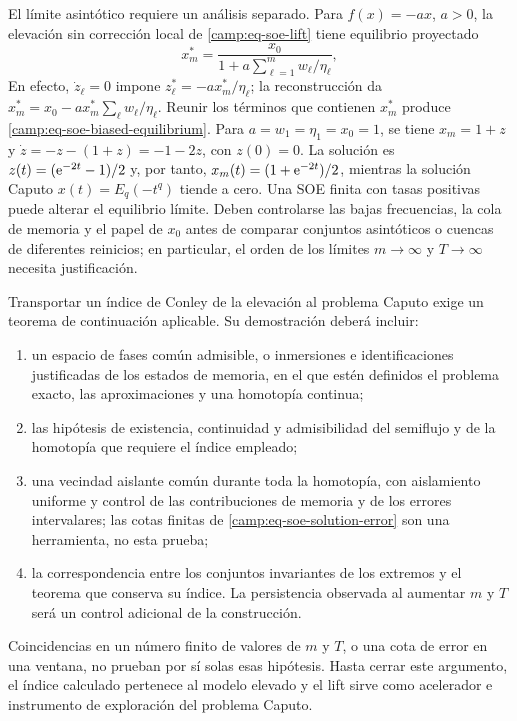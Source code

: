 El límite asintótico requiere un análisis separado. Para \(f(x)=-ax\),
\(a>0\), la elevación sin corrección local de \cref{camp:eq-soe-lift} tiene
equilibrio proyectado
\begin{equation}
 x_m^*=\frac{x_0}{1+a\sum_{\ell=1}^{m}w_\ell/\eta_\ell},
 \label{camp:eq-soe-biased-equilibrium}
\end{equation}
En efecto, \(\dot z_\ell=0\) impone
\(z_\ell^*=-ax_m^*/\eta_\ell\); la reconstrucción da
\(x_m^*=x_0-ax_m^*\sum_\ell w_\ell/\eta_\ell\). Reunir los términos que
contienen \(x_m^*\) produce \cref{camp:eq-soe-biased-equilibrium}.
Para \(a=w_1=\eta_1=x_0=1\), se tiene \(x_m=1+z\) y
\(\dot z=-z-(1+z)=-1-2z\), con \(z(0)=0\). La solución es
\(z(t)=(\mathrm e^{-2t}-1)/2\) y, por tanto,
\(x_m(t)=(1+\mathrm e^{-2t})/2\), mientras la solución
Caputo \(x(t)=E_q(-t^q)\) tiende a cero. Una SOE finita con tasas positivas
puede alterar el equilibrio límite. Deben controlarse las bajas frecuencias,
la cola de memoria y el papel de \(x_0\) antes de comparar conjuntos
asintóticos o cuencas de diferentes reinicios; en particular, el orden de los
límites \(m\to\infty\) y \(T\to\infty\) necesita justificación.

Transportar un índice de Conley de la elevación al problema Caputo exige un
teorema de continuación aplicable. Su demostración deberá incluir:

\begin{enumerate}
  \item un espacio de fases común admisible, o inmersiones e identificaciones
        justificadas de los estados de memoria, en el que estén definidos el
        problema exacto, las aproximaciones y una homotopía continua;
  \item las hipótesis de existencia, continuidad y admisibilidad del
        semiflujo y de la homotopía que requiere el índice empleado;
  \item una vecindad aislante común durante toda la homotopía, con aislamiento
        uniforme y control de las contribuciones de memoria y de los errores
        intervalares; las cotas finitas de
        \cref{camp:eq-soe-solution-error} son una herramienta, no esta prueba;
  \item la correspondencia entre los conjuntos invariantes de los extremos y
        el teorema que conserva su índice. La persistencia observada al
        aumentar \(m\) y \(T\) será un control adicional de la construcción.
\end{enumerate}

Coincidencias en un número finito de valores de \(m\) y \(T\), o una cota
de error en una ventana, no prueban por sí solas esas hipótesis. Hasta cerrar
este argumento, el índice calculado pertenece al modelo elevado y el lift
sirve como acelerador e instrumento de exploración del problema Caputo.

